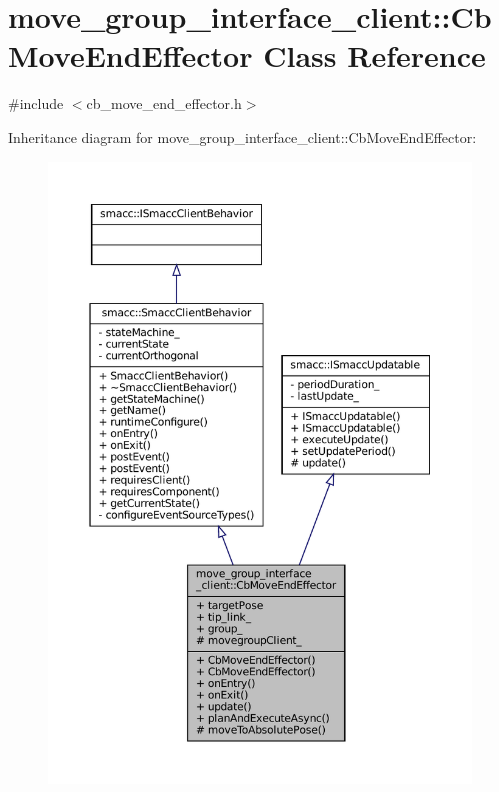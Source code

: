 \hypertarget{classmove__group__interface__client_1_1CbMoveEndEffector}{}\section{move\+\_\+group\+\_\+interface\+\_\+client\+:\+:Cb\+Move\+End\+Effector Class Reference}
\label{classmove__group__interface__client_1_1CbMoveEndEffector}


{\ttfamily \#include $<$cb\+\_\+move\+\_\+end\+\_\+effector.\+h$>$}



Inheritance diagram for move\+\_\+group\+\_\+interface\+\_\+client\+:\+:Cb\+Move\+End\+Effector\+:
\nopagebreak
\begin{figure}[H]
\begin{center}
\leavevmode
\includegraphics[width=350pt]{classmove__group__interface__client_1_1CbMoveEndEffector__inherit__graph}
\end{center}
\end{figure}


